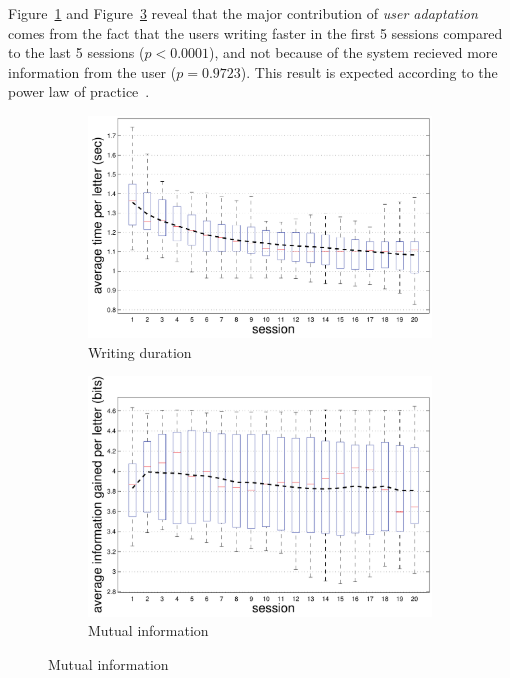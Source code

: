 \documentclass{sigchi}
\begin{document}
Figure~\ref{fig:duration} and Figure~\ref{fig:mutual_information}
reveal that the major contribution of {\em user adaptation} comes from
the fact that the users writing faster in the first 5 sessions
compared to the last 5 sessions ($p < 0.0001$), and not because of the
system recieved more information from the user ($p = 0.9723$). This
result is expected according to the power law of practice~\cite{Newell1981}.

\begin{figure}
  \centering
  \begin{subfigure}[b]{\columnwidth}
    \includegraphics[width=\columnwidth]{figures/IUI_duration_p_adapt.pdf}
    \caption{Writing duration}
    \label{fig:duration}
  \end{subfigure}
  \begin{subfigure}[b]{\columnwidth}
    \includegraphics[width=\columnwidth]{figures/IUI_total_logloss_p_first.pdf}
    \caption{Mutual information}
    \label{fig:mutual_information}
  \end{subfigure}
\end{figure}
\end{document}
